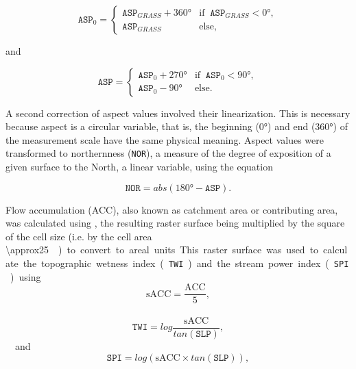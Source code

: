 \begin{equation}
 \texttt{ASP}_{0} =
 \begin{cases}
  \texttt{ASP}_{GRASS} + \ang{360} & \text{if}\;\; \texttt{ASP}_{GRASS} < \ang{0}, \\
  \texttt{ASP}_{GRASS}             & \text{else},
 \end{cases}
\end{equation}

\noindent and

\begin{equation}
 \texttt{ASP} =
 \begin{cases}
  \texttt{ASP}_{0} + \ang{270} & \text{if}\;\; \texttt{ASP}_{0} < \ang{90}, \\
  \texttt{ASP}_{0} - \ang{90}  & \text{else}.
 \end{cases}
\end{equation}

\noindent A second correction of aspect values involved their linearization. This is necessary because aspect 
is a circular variable, that is, the beginning (\ang{0}) and end (\ang{360}) of the measurement scale have the 
same physical meaning. Aspect values were transformed to northernness (\texttt{NOR}), a measure of the degree 
of exposition of a given surface to the North, a linear variable, using the equation

\begin{equation}\label{eqn:NOR}
 \texttt{NOR} = abs(\ang{180} - \texttt{ASP}).
\end{equation}  

Flow accumulation (ACC), also known as catchment area or contributing area, was calculated using 
, the resulting raster surface being multiplied by the square of the cell size (i.e. by the 
cell area \SI{\approx25}{\metre\square}) to convert to areal units. This raster surface was used to calculate 
the topographic wetness index (\texttt{TWI}) and the stream power index (\texttt{SPI}) using

\begin{equation}\label{eqn:sACC}
 \text{sACC} = \dfrac{\text{ACC}}{5},
\end{equation}

\begin{equation}\label{eqn:TWI}
 \texttt{TWI} = log \dfrac{\text{sACC}}{tan(\texttt{SLP})},
\end{equation}

\noindent and

\begin{equation}\label{eqn:SPI}
 \texttt{SPI} = log(\text{sACC} \times tan(\texttt{SLP})),
\end{equation}

